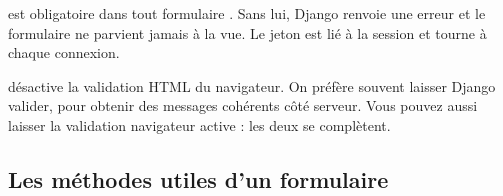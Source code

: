 
\begin{attention}
 est obligatoire dans tout formulaire .
Sans lui, Django renvoie une erreur  et le formulaire ne
parvient jamais à la vue. Le jeton est lié à la session et tourne à chaque
connexion.
\end{attention}

\begin{note}
 désactive la validation HTML du navigateur. On préfère souvent
laisser Django valider, pour obtenir des messages cohérents côté serveur. Vous
pouvez aussi laisser la validation navigateur active : les deux se complètent.
\end{note}

\subsection{Les méthodes utiles d'un formulaire}

